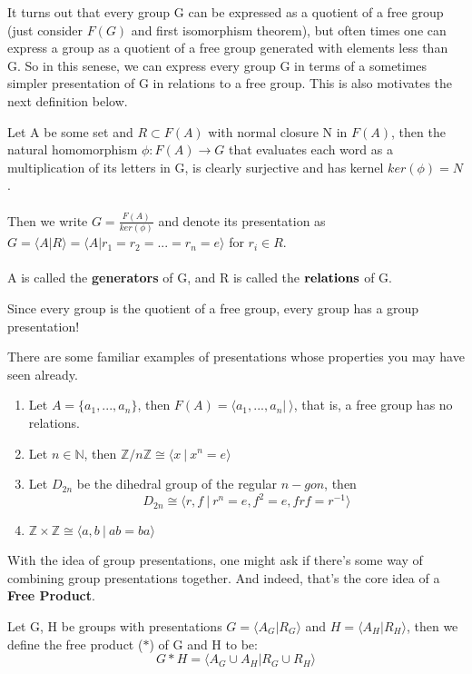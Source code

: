 \noindent It turns out that every group G can be expressed as a quotient of a free group (just consider $F(G)$ and first isomorphism theorem), but often times one can express a group as a quotient of a free group generated with elements less than G. So in this senese, we can express every group G in terms of a sometimes simpler presentation of G in relations to a free group. This is also motivates the next definition below.
\begin{definition} Let A be some set and $R \subset F(A)$ with normal closure N in $F(A)$, then the natural homomorphism $\phi: F(A) \to G$ that evaluates each word as a multiplication of its letters in G, is clearly surjective and has kernel $ker(\phi) = N$.\\\\
Then we write $G = \frac{F(A)}{ker(\phi)}$ and denote its presentation as $G = \langle A | R \rangle = \langle A | r_1 = r_2 = ... = r_n = e \rangle$ for $r_i \in R$.\\\\
A is called the {\bf generators} of G, and R is called the ${\bf relations}$ of G.
\end{definition}
\noindent Since every group is the quotient of a free group, every group has a group presentation!
\begin{example} There are some familiar examples of presentations whose properties you may have seen already.
\begin{enumerate}
    \item Let $A = \{a_1, ..., a_n\}$, then $F(A) = \langle a_1, ..., a_n |\ \rangle$, that is, a free group has no relations.
    \item Let $n \in \mathbb{N}$, then $\mathbb{Z}/n\mathbb{Z} \cong \langle x\ |\ x^n = e\rangle$
    \item Let $D_{2n}$ be the dihedral group of the regular $n-gon$, then
    \[D_{2n} \cong \langle r,f\ |\ r^n = e, f^2 = e, frf = r^{-1}\rangle\]
    \item $\mathbb{Z} \times \mathbb{Z} \cong \langle a,b\ |\ ab = ba\rangle$
\end{enumerate}
\end{example}

\noindent With the idea of group presentations, one might ask if there's some way of combining group presentations together. And indeed, that's the core idea of a {\bf Free Product}.

\begin{definition} Let G, H be groups with presentations $G = \langle A_G | R_G \rangle$ and $H = \langle A_H | R_H \rangle$, then we define the free product ($*$) of G and H to be:
\[G * H = \langle A_G \cup A_H | R_G \cup R_H \rangle\]
\end{definition}


